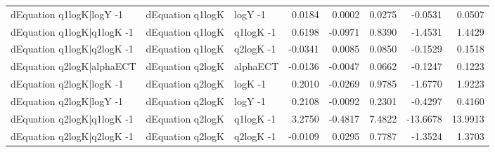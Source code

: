 \begin{table}[!h]
\begin{tabular}[t]{lllrrrrr}
dEquation q1logK|logY -1 & dEquation q1logK & logY -1 & 0.0184 & 0.0002 & 0.0275 & -0.0531 & 0.0507\\
dEquation q1logK|q1logK -1 & dEquation q1logK & q1logK -1 & 0.6198 & -0.0971 & 0.8390 & -1.4531 & 1.4429\\
dEquation q1logK|q2logK -1 & dEquation q1logK & q2logK -1 & -0.0341 & 0.0085 & 0.0850 & -0.1529 & 0.1518\\
\addlinespace
dEquation q2logK|alphaECT & dEquation q2logK & alphaECT & -0.0136 & -0.0047 & 0.0662 & -0.1247 & 0.1223\\
dEquation q2logK|logK -1 & dEquation q2logK & logK -1 & 0.2010 & -0.0269 & 0.9785 & -1.6770 & 1.9223\\
dEquation q2logK|logY -1 & dEquation q2logK & logY -1 & 0.2108 & -0.0092 & 0.2301 & -0.4297 & 0.4160\\
dEquation q2logK|q1logK -1 & dEquation q2logK & q1logK -1 & 3.2750 & -0.4817 & 7.4822 & -13.6678 & 13.9913\\
dEquation q2logK|q2logK -1 & dEquation q2logK & q2logK -1 & -0.0109 & 0.0295 & 0.7787 & -1.3524 & 1.3703\\
\bottomrule
\end{tabular}
\end{table}
